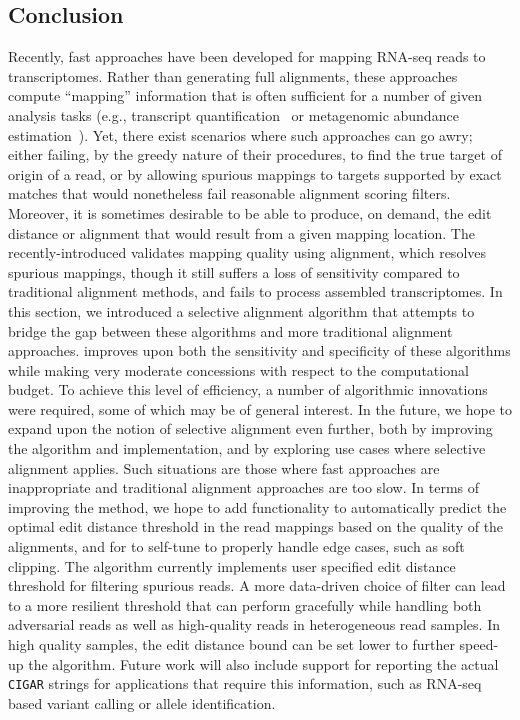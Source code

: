 \subsection{Conclusion}
Recently, fast \nab approaches have been developed for mapping RNA-seq reads to transcriptomes. Rather than 
generating full alignments, these approaches compute ``mapping'' information that is often sufficient for 
a number of  given analysis tasks (e.g., transcript 
quantification~\citep{Patro2014Sailfish,zhang2014rna,Bray2016Kallisto,Patro2017Salmon,ju2017fleximer} 
or metagenomic abundance estimation~\citep{Schaeffer2017}). Yet, there exist scenarios where such \nab approaches 
can go awry; either failing, by the greedy nature of their procedures, to find the true target of origin of 
a read, or by allowing spurious mappings to targets supported by exact matches that would nonetheless fail 
reasonable alignment scoring filters. Moreover, it is sometimes desirable to be able to produce, on demand, 
the edit distance or alignment that would result from a given mapping location. The recently-introduced \hera 
validates mapping quality using alignment, which resolves spurious mappings, though it still suffers a loss of 
sensitivity compared to traditional alignment methods, and fails to process \denovo assembled transcriptomes. 
In this section, we introduced a selective alignment algorithm that attempts to bridge the gap between these \nab 
algorithms and more traditional alignment approaches. \Sla improves upon both the sensitivity and specificity 
of these \nab algorithms while making very moderate concessions with respect to the computational budget. 
To achieve this level of efficiency, a number of algorithmic innovations were required, some of which may be of 
general interest. In the future, we hope to expand upon the notion of selective alignment even further, both by 
improving the algorithm and implementation, and by exploring use cases where selective alignment applies. Such 
situations are those where fast \nab approaches are inappropriate and traditional alignment approaches are too 
slow. In terms of improving the method, we hope to add functionality to automatically predict the optimal edit 
distance threshold in the read mappings based on the quality of the alignments, and for \sla to self-tune to 
properly handle edge cases, such as soft clipping. The \sla algorithm currently implements user specified edit 
distance threshold for filtering spurious reads. A more data-driven choice of filter can lead to a more resilient 
threshold that can perform gracefully while handling both adversarial reads as well as high-quality reads in 
heterogeneous read samples. In high quality samples, the edit distance bound can be set lower to further 
speed-up the algorithm. Future work will also include support for reporting the actual \texttt{CIGAR} strings for 
applications that require this information, such as RNA-seq based variant calling or allele identification.


